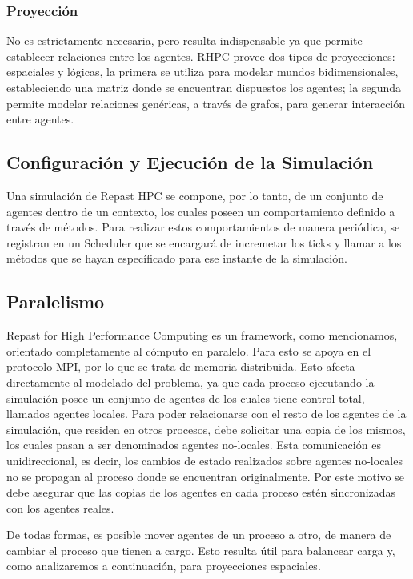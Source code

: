 \subsubsection{Proyección}

No es estrictamente necesaria, pero resulta indispensable ya que permite
establecer relaciones entre los agentes. RHPC provee dos tipos de
proyecciones: espaciales y lógicas, la primera se utiliza para modelar
mundos bidimensionales, estableciendo una matriz donde se encuentran
dispuestos los agentes; la segunda permite modelar relaciones genéricas,
a través de grafos, para generar interacción entre agentes.

\subsection{Configuración y Ejecución de la Simulación}

Una simulación de Repast HPC se compone, por lo tanto, de un conjunto de
agentes dentro de un contexto, los cuales poseen un comportamiento
definido a través de métodos. Para realizar estos comportamientos de
manera periódica, se registran en un Scheduler que se encargará de
incremetar los ticks y llamar a los métodos que se hayan específicado
para ese instante de la simulación.

\subsection{Paralelismo}

Repast for High Performance Computing es un framework, como mencionamos,
orientado completamente al cómputo en paralelo. Para esto se apoya en el
protocolo MPI, por lo que se trata de memoria distribuida. Esto afecta
directamente al modelado del problema, ya que cada proceso ejecutando la
simulación posee un conjunto de agentes de los cuales tiene control
total, llamados agentes locales. Para poder relacionarse con el resto de
los agentes de la simulación, que residen en otros procesos, debe
solicitar una copia de los mismos, los cuales pasan a ser denominados
agentes no-locales. Esta comunicación es unidireccional, es decir, los
cambios de estado realizados sobre agentes no-locales no se propagan al
proceso donde se encuentran originalmente. Por este motivo se debe
asegurar que las copias de los agentes en cada proceso estén
sincronizadas con los agentes reales.

De todas formas, es posible mover agentes de un proceso a otro, de
manera de cambiar el proceso que tienen a cargo. Esto resulta útil para
balancear carga y, como analizaremos a continuación, para proyecciones
espaciales.

